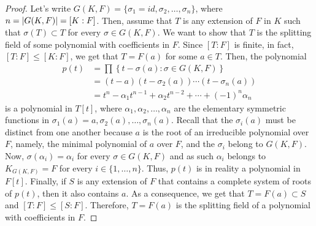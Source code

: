 \begin{proof}
	Let's write $G(K,F)=\{\sigma_{1}=id,\sigma_{2},\ldots,\sigma_{n}\}$, where $n=\lvert G(K,F)\rvert=[K:F]$. Then, assume that $T$ is any extension of $F$ in $K$ such that $\sigma(T)\subset{T}$ for every ${\sigma}\in{G(K,F)}$. We want to show that $T$ is the splitting field of some polynomial with coefficients in $F$. Since $[T:F]$ is finite, in fact, $[T:F]\leqslant{[K:F]}$, we get that $T=F(a)$ for some ${a}\in{T}$. Then, the polynomial
	\begin{align*}
		p(t)
		 & =
		\prod\left\{t-\sigma(a):{\sigma}\in{G(K,F)}\right\}
		\\
		 & =
		(t-a)(t-\sigma_{2}(a))\cdots(t-\sigma_{n}(a))
		\\
		 & =
		t^{n}-\alpha_{1}t^{n-1}+\alpha_{2}t^{n-2}+\cdots+(-1)^{n}\alpha_{n}
	\end{align*}
	is a polynomial in $T[t]$, where $\alpha_{1},\alpha_{2},\ldots,\alpha_{n}$ are the elementary symmetric functions in $\sigma_{1}(a)=a,\sigma_{2}(a),\ldots,\sigma_{n}(a)$. Recall that the $\sigma_{i}(a)$ must be distinct from one another because $a$ is the root of an irreducible polynomial over $F$, namely, the minimal polynomial of $a$ over $F$, and the $\sigma_{i}$ belong to $G(K,F)$. Now, $\sigma(\alpha_{i})=\alpha_{i}$ for every ${\sigma}\in{G(K,F)}$ and as such $\alpha_{i}$ belongs to $K_{G(K,F)}=F$ for every ${i}\in{\{1,\ldots,n\}}$. Thus, $p(t)$ is in reality a polynomial in $F[t]$. Finally, if $S$ is any extension of $F$ that contains a complete system of roots of $p(t)$, then it also contains $a$. As a consequence, we get that $T=F(a)\subset{S}$ and $[T:F]\leqslant{[S:F]}$. Therefore, $T=F(a)$ is the splitting field of a polynomial with coefficients in $F$.


\end{proof}
